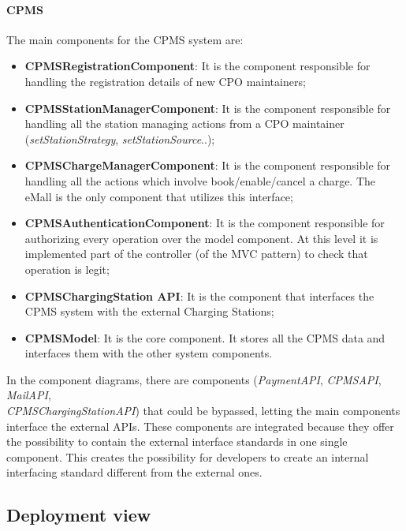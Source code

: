 \paragraph{\textbf{\ac{CPMS}}}
The main components for the \ac{CPMS} system are:
\begin{itemize}
    \item \textbf{\ac{CPMS}RegistrationComponent}: It is the component responsible for handling the registration details of new \ac{CPO} maintainers;
    \item \textbf{\ac{CPMS}StationManagerComponent}: It is the component responsible for handling all the station managing actions from a \ac{CPO} maintainer (\textit{setStationStrategy}, \textit{setStationSource}..);
    \item \textbf{\ac{CPMS}ChargeManagerComponent}: It is the component responsible for handling all the actions which involve book/enable/cancel a charge. The \ac{eMall} is the only component that utilizes this interface;
    \item \textbf{\ac{CPMS}AuthenticationComponent}: It is the component responsible for authorizing every operation over the model component. At this level it is implemented part of the controller (of the \ac{MVC} pattern) to check that operation is legit;
    \item \textbf{\ac{CPMS}ChargingStation \ac{API}}: It is the component that interfaces the \ac{CPMS} system with the external Charging Stations;
    \item \textbf{\ac{CPMS}Model}: It is the core component. It stores all the \ac{CPMS} data and interfaces them with the other system components.
\end{itemize}
In the component diagrams, there are components (\textit{Payment\ac{API}}, \textit{\ac{CPMS}\ac{API}}, \textit{Mail\ac{API}}, \\\textit{\ac{CPMS}ChargingStationAPI}) that could be bypassed, letting the main components interface the external \acp{API}. These components are integrated because they offer the possibility to contain the external interface standards in one single component. This creates the possibility for developers to create an internal interfacing standard different from the external ones.

\subsection{Deployment view}

